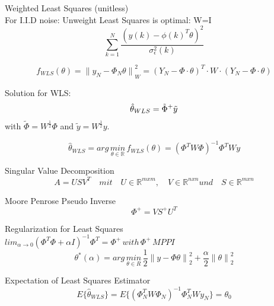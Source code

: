 Weighted Least Squares (unitless)\\
For I.I.D noise: Unweight Least Squares is optimal: W=I
\begin{equation*}
\sum _{ k=1 }^{ N }\frac {{{ (y(k)-{ \phi (k) }^{ T }\theta )}^{2  } }}{\sigma_{\epsilon}^{2}(k)}
\end{equation*}


\begin{equation*}
{ f }_{ WLS }(\theta )={ \parallel { y }_{ N }-{ \Phi  }_{ N }\theta \parallel  }_{ W }^{ 2 }={ ({ Y }_{ N }-\Phi \cdot \theta ) }^{ T }\cdot W\cdot  ({ Y }_{ N }-\Phi \cdot \theta )
\end{equation*}

Solution for WLS:
\begin{equation*}
\hat{\theta}_{WLS} = \tilde{\Phi}^+\tilde{y} \\
\end{equation*}
with $\tilde{\Phi} = W^{\frac{1}{2}} \Phi$ and $\tilde{y} = W^{\frac{1}{2}} y$.


\begin{equation*}
{ \hat{\theta} }_{ WLS }=arg\, \underset{ \theta \in \mathbb{R} }{ min }\,{f  }_{WLS  }(\theta)={ ({\Phi}^{T}W\Phi) }^{ -1 }{\Phi}^{T} Wy
\end{equation*}


Singular Value Decomposition
\begin{equation*}
A=US{ V }^{ T }\quad mit\quad U\in\mathbb{{R}}^{mxm}, \quad V\in\mathbb{{R}}^{nxn} und \quad S\in\mathbb{{R}}^{mxn}
\end{equation*}

Moore Penrose Pseudo Inverse
\begin{equation*}
{ \Phi  }^{ + }=V{ S }^{+}{U}^{T}
\end{equation*}

Regularization for Least Squares\\
\( { lim }_{ \alpha \rightarrow 0 }{ ({ \Phi  }^{ T }\Phi +\alpha { I }) }^{ -1 }{ \Phi  }^{ T }={ \Phi  }^{ + }\, with\,{ \Phi  }^{ + }\, MPPI \)
\begin{equation*}
{ \theta  }^{ * }(\alpha )=arg\, \underset { \theta \in { R } }{ min } \, \frac { 1 }{ 2 } {\parallel y-\Phi\theta \parallel}_{2}^{2}+\frac { \alpha }{ 2 } {\parallel \theta\parallel}_{2}^{2}
\end{equation*}

Expectation of Least Squares Estimator
\begin{equation*}
{ E }\{ { \hat { \theta  } _{ WLS } }\} { ={ E }\{ ({ \Phi  }_{ N }^{ T }W{ \Phi  }_{ N }) }^{ -1 }{ \Phi  }_{ N }^{ T }W{ y }_{ N }\} ={\theta}_{0}
\end{equation*}


